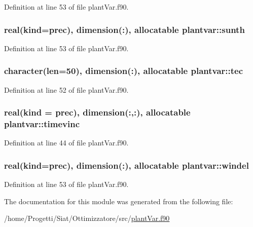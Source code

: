 Definition at line 53 of file plant\-Var.\-f90.

\hypertarget{classplantvar_a1de4d45e17d60dcfca28b6bd17e74e05}{
\subsubsection[{sunth}]{\setlength{\rightskip}{0pt plus 5cm}real(kind=prec), dimension(\-:), allocatable plantvar\-::sunth}}\label{classplantvar_a1de4d45e17d60dcfca28b6bd17e74e05}


Definition at line 53 of file plant\-Var.\-f90.

\hypertarget{classplantvar_a4de39d7f2e55534eeac1a570bf8d30ff}{
\subsubsection[{tec}]{\setlength{\rightskip}{0pt plus 5cm}character(len=50), dimension(\-:), allocatable plantvar\-::tec}}\label{classplantvar_a4de39d7f2e55534eeac1a570bf8d30ff}


Definition at line 52 of file plant\-Var.\-f90.

\hypertarget{classplantvar_aade5aa28513690acf2cf215b0dc1acd2}{
\subsubsection[{timevinc}]{\setlength{\rightskip}{0pt plus 5cm}real(kind = prec), dimension(\-:,\-:), allocatable plantvar\-::timevinc}}\label{classplantvar_aade5aa28513690acf2cf215b0dc1acd2}


Definition at line 44 of file plant\-Var.\-f90.

\hypertarget{classplantvar_a90a77172411c06cf156d494ea2902bfd}{
\subsubsection[{windel}]{\setlength{\rightskip}{0pt plus 5cm}real(kind=prec), dimension(\-:), allocatable plantvar\-::windel}}\label{classplantvar_a90a77172411c06cf156d494ea2902bfd}


Definition at line 53 of file plant\-Var.\-f90.



The documentation for this module was generated from the following file\-:\begin{DoxyCompactItemize}
\item 
/home/\-Progetti/\-Siat/\-Ottimizzatore/src/\hyperlink{plant_var_8f90}{plant\-Var.\-f90}\end{DoxyCompactItemize}
